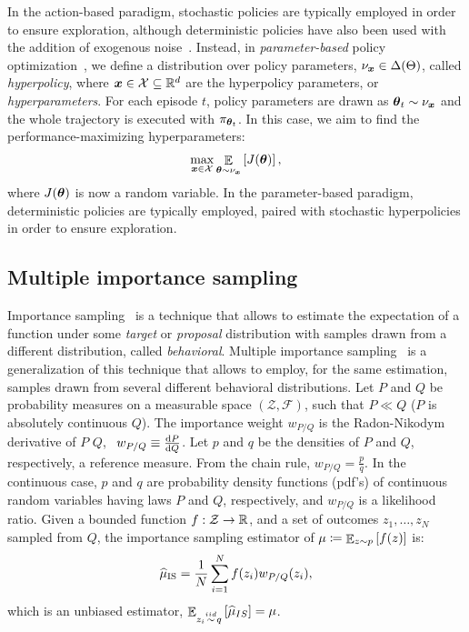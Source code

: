 \documentclass{article}
\begin{document}
In the action-based paradigm, stochastic policies are typically employed in order to ensure exploration, although deterministic policies have also been used with the addition of exogenous noise~\citep{silver2014deterministic}.
Instead, in \textit{parameter-based} policy optimization~\citep{sehnke2008policy}, we define a distribution over policy parameters, $\nu_{\boldsymbol{x}}\in\Delta(\Theta)$, called \textit{hyperpolicy}, where $\boldsymbol{x}\in\mathcal{X}\subseteq\mathbb{R}^d$ are the hyperpolicy parameters, or \textit{hyperparameters}. For each episode $t$, policy parameters are drawn as $\boldsymbol{\theta}_t\sim\nu_{\boldsymbol{x}}$ and the whole trajectory is executed with $\pi_{\boldsymbol{\theta}_t}$. In this case, we aim to find the performance-maximizing hyperparameters:
\begin{align}\label{eq:Jx}
	\max_{\boldsymbol{x}\in\mathcal{X}} \mathop{\mathbb{E}}_{\boldsymbol{\theta}\sim\nu_{\boldsymbol{x}}}\left[J(\boldsymbol{\theta})\right],
\end{align}
where $J(\boldsymbol{\theta})$ is now a random variable.
In the parameter-based paradigm, deterministic policies are typically employed, paired with stochastic hyperpolicies in order to ensure exploration.

\subsection{Multiple importance sampling}
Importance sampling~\citep{cochran2007sampling,mcbook} is a technique that allows to estimate the expectation of a function under some \textit{target} or \textit{proposal} distribution with samples drawn from a different distribution, called \textit{behavioral}. Multiple importance sampling~\citep{veach_optimally_1995} is a generalization of this technique that allows to employ, for the same estimation, samples drawn from several different behavioral distributions. Let $P$ and $Q$ be probability measures on a measurable space $(\mathcal{Z}, \mathcal{F})$, such that $P\ll Q$ (\ie $P$ is absolutely continuous \wrt $Q$). The importance weight $w_{P/Q}$ is the Radon-Nikodym derivative of $P$ \wrt $Q$, \ie~$w_{P/Q} \equiv \frac{\mathrm{d} P}{\mathrm{d} Q}$. Let $p$ and $q$ be the densities of $P$ and $Q$, respectively, \wrt a reference measure. From the chain rule, $w_{P/Q} = \frac{p}{q}$. In the continuous case, $p$ and $q$ are probability density functions (pdf's) of continuous random variables having laws $P$ and $Q$, respectively, and $w_{P/Q}$ is a likelihood ratio. 
Given a bounded function $f:\mathcal{Z}\to\mathbb{R}$, and a set of \iid outcomes $z_1,\dots,z_N$ sampled from $Q$, the importance sampling estimator of $\mu\coloneqq\mathop{\mathbb{E}}_{z\sim p}\left[f(z)\right]$ is:
\begin{align}\label{eq:ise}
	\widehat{\mu}_{\text{IS}} = \frac{1}{N}\sum_{i=1}^{N}f(z_i)w_{P/Q}(z_i),
\end{align}
which is an unbiased estimator, \ie ${\mathop{\mathbb{E}}_{z_i\stackrel{iid}{\sim} q}\left[\widehat{\mu}_{IS}\right] = \mu}$. 
\end{document}
